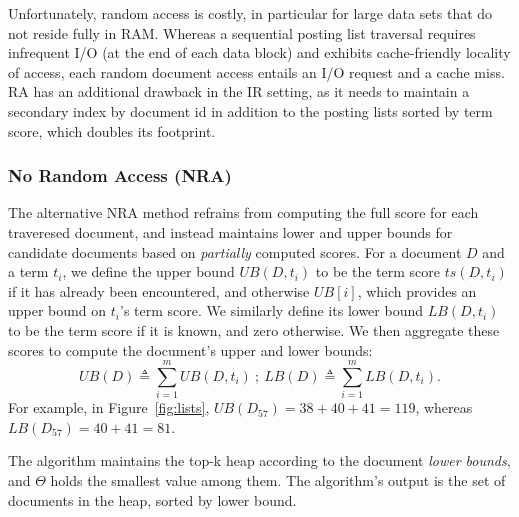 Unfortunately, random access is costly,  in particular for large data sets that do not reside fully in RAM.
Whereas a sequential posting list traversal requires infrequent I/O (at the end of each data block) and exhibits cache-friendly locality of access,  each random document access entails an I/O request and a cache miss.  
RA has an additional drawback in the IR setting, as it needs to maintain a secondary index by document id in addition to the posting lists sorted by term score, which doubles its footprint. 

\subsubsection{No Random Access (NRA)} 
The alternative NRA method %
refrains from computing the full score for each traveresed document, and instead
maintains lower and upper bounds for candidate documents based on {\em partially\/} computed scores. 
For a document $D$ and a term $t_i$, we define the upper bound $UB(D, t_i)$ to be the term score $ts(D, t_i)$ if it has already been encountered, and otherwise $UB[i]$, which provides an upper bound on $t_i$'s term score. We similarly define its lower bound $LB(D, t_i)$ to be the term score if it is known, and zero otherwise. We then aggregate these scores to compute the document's upper and lower bounds:
\[
UB(D) \triangleq \sum_{i=1}^m UB(D, t_i) \ ; \  
LB(D) \triangleq \sum_{i=1}^m LB(D, t_i).
\] 
For example, in Figure~\ref{fig:lists}, $UB(D_{57}) = 38+40+41 = 119$, whereas $LB(D_{57}) = 40+41 = 81$.

The algorithm maintains the top-k heap according to the document \emph{lower bounds}, and $\Theta$ holds the smallest value among them. 
The algorithm's output is the set of documents in the heap, sorted by lower bound.


